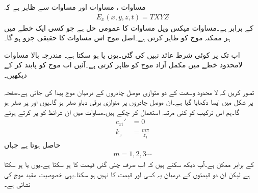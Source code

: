 مساوات ، مساوات  اور مساوات  سے ظاہر ہے کہ
\begin{align}\label{مساوات_مویج_گمکی_عمومی_ت}
E_x(x,y,z,t)=T X Y Z 
\end{align}
کے برابر ہے۔مساوات  میکس ویل مساوات کا عمومی حل ہے جو کسی ایک خطے میں ہر ممکنہ  موج کو ظاہر کرتی ہے۔اصل موج اس مساوات کا حقیقی  جزو ہو گا۔

اب تک  پر کوئی شرط عائد نہیں کی گئی۔یوں  یا  ہو سکتا ہے۔ مندرجہ بالا مساوات لامحدود خطے میں مکمل آزاد موج کو ظاہر کرتی ہے۔آئیں اب موج کو پابند کر کے دیکھیں۔ 

تصور کریں کہ لا محدود وسعت کے دو متوازی موصل چادروں کے درمیان موج پیدا کی جاتی ہے۔صفحہ  پر شکل  میں ایسا دکھایا گیا ہے۔ان موصل چادروں پر متوازی برقی دباو صفر ہو گا۔یوں  اور  پر  صفر ہو گا۔ہم 
اس ترکیب کو کئی مرتبہ استعمال کر چکے ہیں۔مساوات  میں ان شرائط کو پر کرتے ہوئے 
\begin{align}
c_{z1}'&=0\\
k_z &=\frac{m \pi}{z_1}\label{مساوات_مویج_میکس_ویل_عمومی_مستطیلی_شرط_الف}
\end{align}
حاصل ہوتا ہے جہاں
\begin{align}
m=1,2,3\cdots
\end{align}
کے برابر ممکن ہے۔آپ دیکھ سکتے ہیں کہ  اب صرف چنی گئی قیمت کا ہو سکتا ہے۔یوں  یا   ہو سکتا ہے لیکن ان دو قیمتوں کے درمیان یہ کسی اور قیمت کا نہیں ہو سکتا۔یہی خصوصیت مقید موج کی نشانی ہے۔

